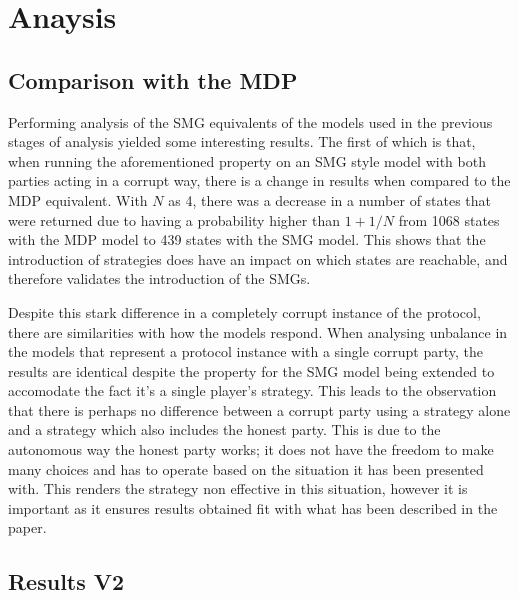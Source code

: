 \documentclass{l4proj}
\begin{document}
\section{Anaysis}

\subsection{Comparison with the MDP}
Performing analysis of the SMG equivalents of the models used in the previous stages of analysis yielded some interesting results. The first of which is that, when running the aforementioned property on an SMG style model with both parties acting in a corrupt way, there is a change in results when compared to the MDP equivalent. With $N$ as 4, there was a decrease in a number of states that were returned due to having a probability higher than $1+1/N$ from 1068 states with the MDP model to 439 states with the SMG model. This shows that the introduction of strategies does have an impact on which states are reachable, and therefore validates the introduction of the SMGs.

Despite this stark difference in a completely corrupt instance of the protocol, there are similarities with how the models respond. When analysing unbalance in the models that represent a protocol instance with a single corrupt party, the results are identical despite the property for the SMG model being extended to accomodate the fact it's a single player's strategy. This leads to the observation that there is perhaps no difference between a corrupt party using a strategy alone and a strategy which also includes the honest party. This is due to the autonomous way the honest party works; it does not have the freedom to make many choices and has to operate based on the situation it has been presented with. This renders the strategy non effective in this situation, however it is important as it ensures results obtained fit with what has been described in the paper.


\subsection{Results V2}
\end{document}
